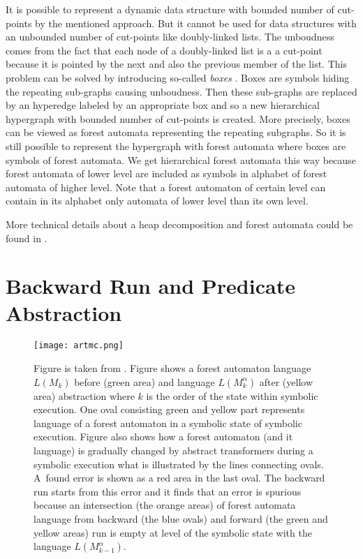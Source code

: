 \documentclass[fleqn,11pt]{ExcelAtFIT} %
\begin{document}
It is possible to represent a dynamic data structure with bounded number of cut-points by the mentioned approach.
But it cannot be used for data structures with an unbounded number of cut-points like doubly-linked lists.
The unboudness comes from the fact that each node of a doubly-linked list is a a cut-point because
it is pointed by the next and also the previous member of the list.
This problem can be solved by introducing so-called \emph{boxes} \cite{forester13}.
Boxes are symbols hiding the repeating sub-graphs causing unboudness.
Then these sub-graphs are replaced by an hyperedge labeled by an appropriate box
and so a new hierarchical hypergraph with bounded number of cut-points is created.
More precisely, boxes can be viewed as forest automata representing the repeating subgraphs.
So it is still possible to represent the hypergraph with forest automata where
boxes are symbols of forest automata.
We get hierarchical forest automata this way because forest automata of lower level
are included as symbols in alphabet of forest automata of higher level.
Note that a forest automaton of certain level can contain in its alphabet only automata of lower level than its own level.

More technical details about a heap decomposition and forest automata could be found in \cite{forester11, forester13}.

\section{Backward Run and Predicate Abstraction}
\label{sec:br}

\begin{figure}[t]
	\centering
	\texttt{[image: artmc.png]}
	\caption{
		Figure is taken from \cite{artmc}.
		Figure shows a forest automaton language $L(M_k)$ before (green area)
		and language $L(M_k^{\alpha})$ after (yellow area) abstraction where
		$k$ is the order of the state within symbolic execution.
		One oval consisting green and yellow part represents
		language of a forest automaton in a symbolic state of symbolic execution.
		Figure also shows how a forest automaton (and it language) is gradually changed
		by abstract transformers during a symbolic execution what is illustrated by the lines connecting ovals.
		A~found error is shown as a red area in the last oval.
		The backward run starts from this error and it finds
		that an error is spurious because an intersection (the orange areas) of forest automata language from backward (the blue ovals)
		and forward (the green and yellow areas) run is empty at level of the symbolic state with the language $L(M^{\alpha}_{k-1})$.}
	\label{fig:bwrun}
\end{figure}
\end{document}
